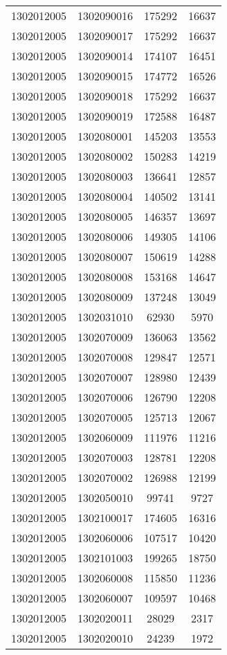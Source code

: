 \begin{longtable}{llcc}
1302012005 & 1302090016 & 175292 & 16637\\
1302012005 & 1302090017 & 175292 & 16637\\
1302012005 & 1302090014 & 174107 & 16451\\
1302012005 & 1302090015 & 174772 & 16526\\
1302012005 & 1302090018 & 175292 & 16637\\
1302012005 & 1302090019 & 172588 & 16487\\
1302012005 & 1302080001 & 145203 & 13553\\
1302012005 & 1302080002 & 150283 & 14219\\
1302012005 & 1302080003 & 136641 & 12857\\
1302012005 & 1302080004 & 140502 & 13141\\
1302012005 & 1302080005 & 146357 & 13697\\
1302012005 & 1302080006 & 149305 & 14106\\
1302012005 & 1302080007 & 150619 & 14288\\
1302012005 & 1302080008 & 153168 & 14647\\
1302012005 & 1302080009 & 137248 & 13049\\
1302012005 & 1302031010 & 62930 & 5970\\
1302012005 & 1302070009 & 136063 & 13562\\
1302012005 & 1302070008 & 129847 & 12571\\
1302012005 & 1302070007 & 128980 & 12439\\
1302012005 & 1302070006 & 126790 & 12208\\
1302012005 & 1302070005 & 125713 & 12067\\
1302012005 & 1302060009 & 111976 & 11216\\
1302012005 & 1302070003 & 128781 & 12208\\
1302012005 & 1302070002 & 126988 & 12199\\
1302012005 & 1302050010 & 99741 & 9727\\
1302012005 & 1302100017 & 174605 & 16316\\
1302012005 & 1302060006 & 107517 & 10420\\
1302012005 & 1302101003 & 199265 & 18750\\
1302012005 & 1302060008 & 115850 & 11236\\
1302012005 & 1302060007 & 109597 & 10468\\
1302012005 & 1302020011 & 28029 & 2317\\
1302012005 & 1302020010 & 24239 & 1972\\

\end{longtable}
